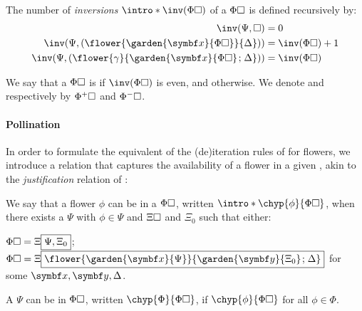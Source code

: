 \begin{scope}
\begin{definition}[Inversions]
  The number of \emph{inversions} $\intro*\inv(\Phi\hole)$ of a  $\Phi\square$ is
  defined recursively by:
  \begin{align*}
    \inv(\Psi, \hole) &= 0 \\
    \inv(\Psi, (\flower{\garden{\bx}{\Phi\hole}}{\Delta})) &= \inv(\Phi\hole) + 1 \\
    \inv(\Psi, (\flower{\gamma}{\garden{\bx}{\Phi\hole} \sep \Delta})) &= \inv(\Phi\hole)
  \end{align*}
\end{definition}

\begin{definition}[Polarity]
  We say that a  $\Phi\square$ is  if
  $\inv(\Phi\hole)$ is even, and  otherwise. We denote 
  and   respectively by $\Phi^+\square$ and $\Phi^-\square$.
\end{definition}

\paragraph{Pollination}

In order to formulate the equivalent of the (de)iteration rules of  for
flowers, we introduce a \emph{} relation that captures the
availability of a flower in a given , akin to the \emph{justification}
relation of :

\begin{definition}[Pollination]
  
  We say that a flower $\phi$ can be  in a 
  $\Phi\square$, written $\intro*\chyp{\phi}{\Phi\hole}$, when there exists a
   $\Psi$ with $\phi \in \Psi$ and  $\Xi\square$ and
  $\Xi_{0}$ such that either:
  \begin{description}
     $\Phi\square = \Xi\fbox{$\Psi,
    \Xi_{0}$}$;
     $\Phi\hole =
    \cfill{\Xi}{\flower{\garden{\bx}{\Psi}}{\garden{\by}{\Xi_{0}}
    \sep \Delta}}$ for some $\bx, \by, \Delta$.
  \end{description}
  A  $\Psi$ can be  in $\Phi\square$, written
  $\chyp{\Phi}{\Phi\hole}$, if $\chyp{\phi}{\Phi\hole}$ for all $\phi \in \Phi$.
\end{definition}


\end{scope}
